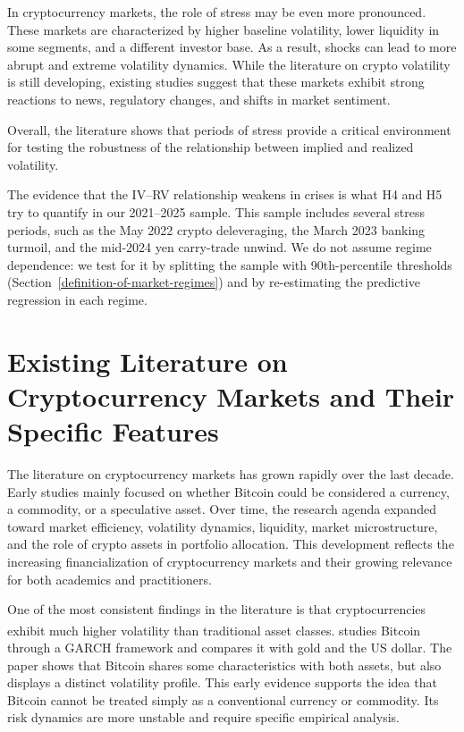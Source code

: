 \documentclass[11pt,a4paper,openany]{report}
\newcommand{\fcitet}[1]{%
  \citet{#1}%
  \refstepcounter{footnote}%
  \hyperlink{cite.#1}{\textsuperscript{\thefootnote}}%
  \footnotetext{\bibentry{#1}.}%
}
\begin{document}
In cryptocurrency markets, the role of stress may be even more
pronounced. These markets are characterized by higher baseline
volatility, lower liquidity in some segments, and a different investor
base. As a result, shocks can lead to more abrupt and extreme volatility
dynamics. While the literature on crypto volatility is still developing,
existing studies suggest that these markets exhibit strong reactions to
news, regulatory changes, and shifts in market sentiment.

Overall, the literature shows that periods of stress provide a critical
environment for testing the robustness of the relationship between
implied and realized volatility.

The evidence that the IV--RV relationship weakens in crises is what
H4 and H5 try to quantify in our 2021--2025 sample. This sample
includes several stress periods, such as the May 2022 crypto
deleveraging, the March 2023 banking turmoil, and the mid-2024 yen
carry-trade unwind. We do not assume regime dependence: we test for it
by splitting the sample with 90th-percentile thresholds
(Section~\ref{definition-of-market-regimes}) and by re-estimating the
predictive regression in each regime.

\section{Existing Literature on Cryptocurrency Markets and Their
Specific
Features}\label{existing-literature-on-cryptocurrency-markets-and-their-specific-features}

The literature on cryptocurrency markets has grown rapidly over the last
decade. Early studies mainly focused on whether Bitcoin could be
considered a currency, a commodity, or a speculative asset. Over time,
the research agenda expanded toward market efficiency, volatility
dynamics, liquidity, market microstructure, and the role of crypto
assets in portfolio allocation. This development reflects the increasing
financialization of cryptocurrency markets and their growing relevance
for both academics and practitioners.

One of the most consistent findings in the literature is that
cryptocurrencies exhibit much higher volatility than traditional asset
classes. \fcitet{dyhrberg2016} studies Bitcoin through a GARCH framework
and compares it with gold and the US dollar. The paper shows that
Bitcoin shares some characteristics with both assets, but also displays
a distinct volatility profile. This early evidence supports the idea
that Bitcoin cannot be treated simply as a conventional currency or
commodity. Its risk dynamics are more unstable and require specific
empirical analysis.
\end{document}
